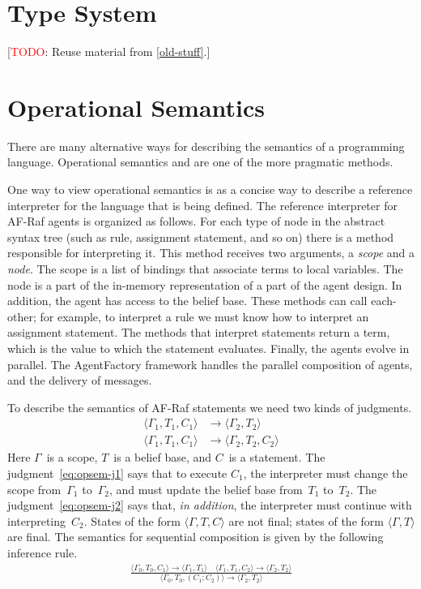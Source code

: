 \documentclass[a4paper,12pt,oneside,fleqn]{book} %
\newcommand{\todo}[1]{[\textcolor{red}{TODO}: #1]}
\begin{document}
\section{Type System} %

\todo{Reuse material from \autoref{old-stuff}.}

\section{Operational Semantics}\label{sec:opsem} %

There are many alternative ways for describing the semantics of a
programming language. Operational semantics and are one of the more
pragmatic methods.

One way to view operational semantics is as a concise way to describe a
reference interpreter for the language that is being defined. The reference
interpreter for AF-Raf agents is organized as follows. For each type of
node in the abstract syntax tree (such as rule, assignment statement, and
so on) there is a method responsible for interpreting it. This method
receives two arguments, a \emph{scope} and a \emph{node}. The scope is a
list of bindings that associate terms to local variables. The node is a
part of the in-memory representation of a part of the agent design. In
addition, the agent has access to the belief base. These methods can call
each-other; for example, to interpret a rule we must know how to interpret
an assignment statement. The methods that interpret statements return a
term, which is the value to which the statement evaluates. Finally, the
agents evolve in parallel. The AgentFactory framework handles the parallel
composition of agents, and the delivery of messages.

To describe the semantics of AF-Raf statements we need two kinds of
judgments.
\begin{align}
\langle \Gamma_1, T_1, C_1 \rangle &\to \langle\Gamma_2,T_2\rangle
  \label{eq:opsem-j1} \\
\langle \Gamma_1, T_1, C_1 \rangle &\to \langle \Gamma_2, T_2, C_2 \rangle
  \label{eq:opsem-j2}
\end{align}
Here $\Gamma$~is a scope, $T$~is a belief base, and $C$~is a statement.
The judgment~\eqref{eq:opsem-j1} says that to execute $C_1$, the
interpreter must change the scope from~$\Gamma_1$ to~$\Gamma_2$, and must
update the belief base from~$T_1$ to~$T_2$. The
judgment~\eqref{eq:opsem-j2} says that, \emph{in addition}, the interpreter
must continue with interpreting~$C_2$.  States of the form
$\langle\Gamma,T,C\rangle$ are not final; states of the form
$\langle\Gamma,T\rangle$ are final.  The semantics for sequential
composition is given by the following inference rule.
\begin{align}
\frac
  {\langle\Gamma_0,T_0,C_1\rangle\to\langle\Gamma_1,T_1\rangle
  \quad
  \langle\Gamma_1,T_1,C_2\rangle\to\langle\Gamma_2,T_2\rangle}
  {\langle\Gamma_0,T_0,(C_1;C_2)\rangle\to\langle\Gamma_2,T_2\rangle}
\end{align}
\end{document}
